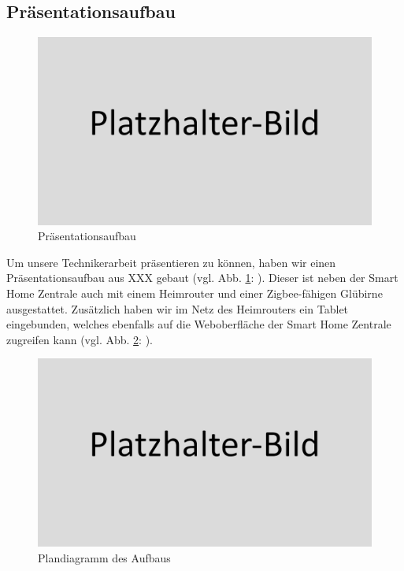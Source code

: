 \subsection{Präsentationsaufbau}\label{hw_testaufbau}
\begin{figure}[H]
    \includegraphics[width=1\textwidth]{img/placeholder.png}
    \caption[Präsentationsaufbau]{Präsentationsaufbau}
    \label{fig:praesentationsaufbau}
\end{figure}
Um unsere Technikerarbeit präsentieren zu können, haben wir einen Präsentationsaufbau aus XXX gebaut (vgl. Abb. \ref{fig:praesentationsaufbau}: ).
Dieser ist neben der Smart Home Zentrale auch mit einem Heimrouter und einer Zigbee-fähigen Glübirne ausgestattet.
Zusätzlich haben wir im Netz des Heimrouters ein Tablet eingebunden, welches ebenfalls auf die Weboberfläche der Smart Home Zentrale zugreifen kann (vgl. Abb. \ref{fig:praesentationsaufbau_diagramm}: ).
\begin{figure}[H]
    \includegraphics[width=1\textwidth]{img/placeholder.png}
    \caption[Plandiagramm des Aufbaus]{Plandiagramm des Aufbaus}
    \label{fig:praesentationsaufbau_diagramm}
\end{figure}